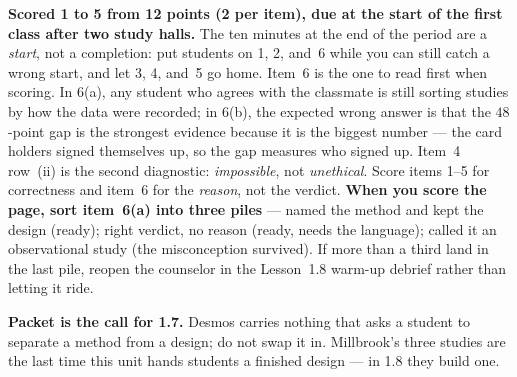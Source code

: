 \documentclass[10pt]{article}
\begin{document}
\begin{teachernote}[Homework]
\textbf{Scored 1 to 5 from 12 points (2 per item), due at the start of the first class after two study
halls.} The ten minutes at the end of the period are a \emph{start}, not a completion: put
students on 1, 2, and~6 while you can still catch a wrong start, and let 3, 4, and~5 go home.
Item~6 is the one to read first when scoring. In 6(a), any student who agrees with the classmate
is still sorting studies by how the data were recorded; in 6(b), the expected wrong answer is
that the $48$-point gap is the strongest evidence because it is the biggest number --- the
card holders signed themselves up, so the gap measures who signed up. Item~4 row~(ii) is the
second diagnostic: \emph{impossible}, not \emph{unethical}. Score items 1--5 for correctness and
item~6 for the \emph{reason}, not the verdict. \textbf{When you score the page, sort item~6(a)
into three piles} --- named the method and kept the design (ready); right verdict, no reason
(ready, needs the language); called it an observational study (the misconception survived). If
more than a third land in the last pile, reopen the counselor in the Lesson~1.8 warm-up debrief
rather than letting it ride.

\textbf{Packet is the call for 1.7.} Desmos carries nothing that asks a student to separate a
method from a design; do not swap it in. Millbrook's three studies are the last time this unit
hands students a finished design --- in 1.8 they build one.
\end{teachernote}
\end{document}
